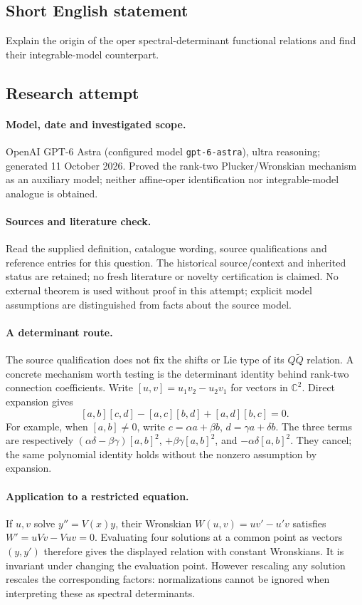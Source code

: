 \documentclass[11pt]{article}
\begin{document}
\subsection{Short English statement}
Explain the origin of the oper spectral-determinant functional relations and find their integrable-model counterpart.
\subsection{Research attempt}
\paragraph{Model, date and investigated scope.}
OpenAI GPT-6 Astra (configured model \texttt{gpt-6-astra}), ultra reasoning; generated 11 October 2026. Proved the rank-two Plucker/Wronskian mechanism as an auxiliary model; neither affine-oper identification nor integrable-model analogue is obtained.

\paragraph{Sources and literature check.}
Read the supplied definition, catalogue wording, source qualifications and reference entries for this question. The historical source/context and inherited status are retained; no fresh literature or novelty certification is claimed. No external theorem is used without proof in this attempt; explicit model assumptions are distinguished from facts about the source model.

\paragraph{A determinant route.} The source qualification does not fix the shifts or Lie type of its \(Q\widetilde Q\) relation. A concrete mechanism worth testing is the determinant identity behind rank-two connection coefficients. Write \([u,v]=u_1v_2-u_2v_1\) for vectors in \(\mathbb C^2\). Direct expansion gives
\[
 [a,b][c,d]-[a,c][b,d]+[a,d][b,c]=0.
\]
For example, when \([a,b]\ne0\), write \(c=\alpha a+\beta b\), \(d=\gamma a+\delta b\). The three terms are respectively \((\alpha\delta-\beta\gamma)[a,b]^2\), \(+\beta\gamma[a,b]^2\), and \(-\alpha\delta[a,b]^2\). They cancel; the same polynomial identity holds without the nonzero assumption by expansion.
\paragraph{Application to a restricted equation.} If \(u,v\) solve \(y''=V(x)y\), their Wronskian \(W(u,v)=uv'-u'v\) satisfies \(W'=uVv-Vuv=0\). Evaluating four solutions at a common point as vectors \((y,y')\) therefore gives the displayed relation with constant Wronskians. It is invariant under changing the evaluation point. However rescaling any solution rescales the corresponding factors: normalizations cannot be ignored when interpreting these as spectral determinants.
\end{document}
